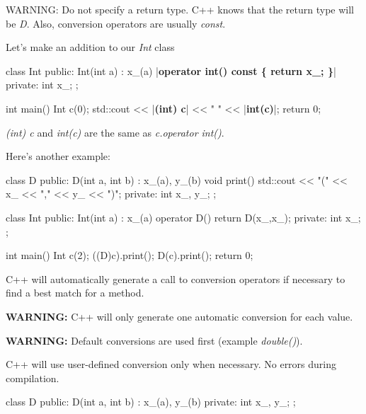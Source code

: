 WARNING: Do not specify a return type. C++ knows that the return type
will be \textit{D}. Also, conversion operators are usually \textit{const}.

Let's make an addition to our \textit{Int} class

\begin{consolethree}[escapeinside=||]
class Int {
public:
    Int(int a)
        : x_(a)
    {}
    |{\bf operator int() const \{ return x\_; \}}|
private:
    int x_;
};
\end{consolethree}

\begin{consolethree}[escapeinside=||]
int main()
{
    Int c(0);
    std::cout << |{\bf (int) c}| << " " << |{\bf int(c)}|;
    return 0;
}
\end{consolethree}

\textit{(int) c} and \textit{int(c)} are the same as \textit{c.operator
int()}.

Here's another example:

\begin{consolethree}[escapeinside=||]
class D
{
public:
    D(int a, int b)
        : x_(a), y_(b)
    {}
    void print()
    {
        std::cout << "(" << x_ << "," << y_ << ")\n";
    }
private:
    int x_, y_;
};
\end{consolethree}

\begin{consolethree}[escapeinside=||]
class Int
{
public:
    Int(int a)
        : x_(a)
    {}
    operator D() { return D(x_,x_); }
private:
    int x_;
};
\end{consolethree}

\begin{consolethree}[escapeinside=||]
int main()
{
    Int c(2);
    ((D)c).print();
    D(c).print();
    return 0;
}
\end{consolethree}


\newpage{}

C++ will automatically generate a call to conversion operators if
necessary to find a best match for a method.

\textbf{WARNING:} C++ will only generate one automatic conversion for
each value.

\textbf{WARNING:} Default conversions are used first (example
\textit{double()}).

C++ will use user-defined conversion only when necessary. No errors
during compilation.

\begin{consolethree}[escapeinside=||]
class D
{
public:
    D(int a, int b)
        : x_(a), y_(b)
    {}
private:
    int x_, y_;
};
\end{consolethree}


